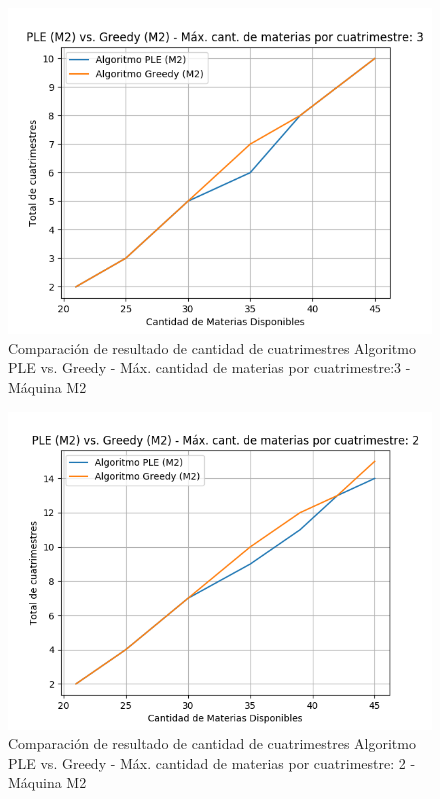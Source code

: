 \documentclass[a4paper]{article}
\begin{document}
\begin{figure}[H]
\centering
\includegraphics[scale=0.65]{Imagenes/m2_PLE_vs_GREEDY_total_cuatrimestres_max_mat_3.png}\par
\caption{Comparación de resultado de cantidad de cuatrimestres Algoritmo PLE vs. Greedy - Máx. cantidad de materias por cuatrimestre:3 - Máquina M2}
\end{figure}

\begin{figure}[H]
\centering
\includegraphics[scale=0.65]{Imagenes/m2_PLE_vs_GREEDY_total_cuatrimestres_max_mat_2.png}\par
\caption{Comparación de resultado de cantidad de cuatrimestres Algoritmo PLE vs. Greedy - Máx. cantidad de materias por cuatrimestre: 2 - Máquina M2}
\end{figure}
\end{document}
